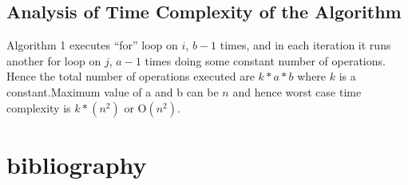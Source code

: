 \documentclass[11pt]{article}
\begin{document}
\subsection{Analysis of Time Complexity of the Algorithm}
Algorithm 1 executes ``for'' loop on $i$, $b-1$ times, and in each iteration it runs another for loop on $j$, $a-1$ times doing some constant number of operations. \\
Hence the total number of operations executed are $k*a*b$ where $k$ is a constant.Maximum value of a and b can be $n$ and hence worst case time complexity is $k*(n^2)$ or O$(n^2)$.
\section{bibliography}

%
%
\end{document}
